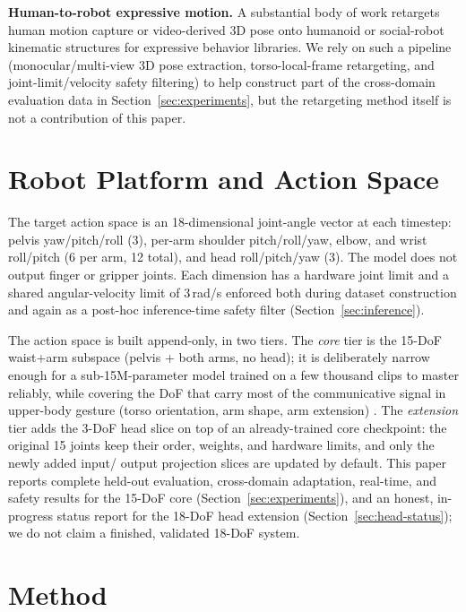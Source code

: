 \documentclass[conference]{IEEEtran}
\begin{document}
\textbf{Human-to-robot expressive motion.} A substantial body of work
retargets human motion capture or video-derived 3D pose onto humanoid
or social-robot kinematic structures for expressive behavior libraries.
We rely on such a pipeline (monocular/multi-view 3D pose extraction,
torso-local-frame retargeting, and joint-limit/velocity safety
filtering) to help construct part of the cross-domain evaluation data
in Section~\ref{sec:experiments}, but the retargeting method itself is
not a contribution of this paper.

\section{Robot Platform and Action Space}
\label{sec:platform}

The target action space is an 18-dimensional joint-angle vector at each
timestep: pelvis yaw/pitch/roll (3), per-arm shoulder pitch/roll/yaw,
elbow, and wrist roll/pitch (6 per arm, 12 total), and head
roll/pitch/yaw (3). The model does not output finger or gripper joints.
Each dimension has a hardware joint limit and a shared angular-velocity
limit of 3\,rad/s enforced both during dataset construction and again
as a post-hoc inference-time safety filter (Section~\ref{sec:inference}).

The action space is built append-only, in two tiers. The \emph{core}
tier is the 15-DoF waist+arm subspace (pelvis + both arms, no head);
it is deliberately narrow enough for a sub-15M-parameter model trained
on a few thousand clips to master reliably, while covering the DoF
that carry most of the communicative signal in upper-body gesture
(torso orientation, arm shape, arm extension) \cite{intentional-gesture}.
The \emph{extension} tier adds the 3-DoF head slice on top of an
already-trained core checkpoint: the original 15 joints keep their
order, weights, and hardware limits, and only the newly added input/
output projection slices are updated by default. This paper reports
complete held-out evaluation, cross-domain adaptation, real-time, and
safety results for the 15-DoF core (Section~\ref{sec:experiments}),
and an honest, in-progress status report for the 18-DoF head extension
(Section~\ref{sec:head-status}); we do not claim a finished, validated
18-DoF system.

\section{Method}
\label{sec:method}
\end{document}
